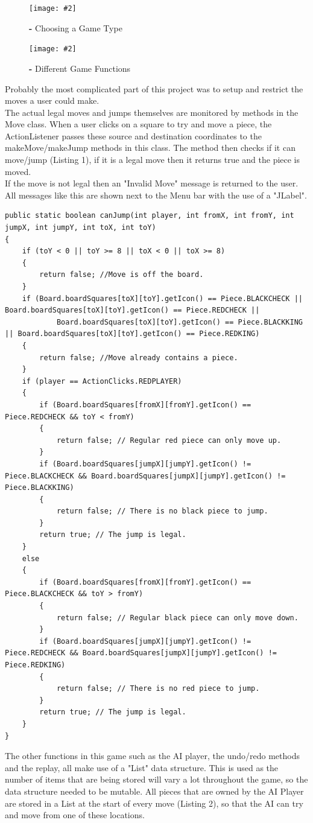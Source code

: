 \documentclass[10pt, a4paper]{article}
\newcommand{\figuremacro}[5]{
    \begin{figure}[#1]
        \centering
        \texttt{[image: \#2]}
        \caption{\textbf#4}
        \label{#3}
    \end{figure}
}
\begin{document}
\figuremacro{H}{Fig4}{}{ - Choosing a Game Type}{0.6}
\figuremacro{H}{Fig5}{}{ - Different Game Functions}{0.6}
\newpage
Probably the most complicated part of this project was to setup and restrict the moves a user could make.
\newline
\\
The actual legal moves and jumps themselves are monitored by methods in the Move class.
When a user clicks on a square to try and move a piece, the ActionListener passes these source and destination coordinates to the makeMove/makeJump methods in this class.
The method then checks if it can move/jump (Listing 1), if it is a legal move then it returns true and the piece is moved.
\newline
\\
If the move is not legal then an "Invalid Move" message is returned to the user. All messages like this are shown next to the Menu bar with the use of a "JLabel".

\begin{lstlisting}[caption = canJump Algorithm - Checking if a Jump is Legal]
public static boolean canJump(int player, int fromX, int fromY, int jumpX, int jumpY, int toX, int toY)
{
	if (toY < 0 || toY >= 8 || toX < 0 || toX >= 8) 
	{
		return false; //Move is off the board.
	}
	if (Board.boardSquares[toX][toY].getIcon() == Piece.BLACKCHECK || Board.boardSquares[toX][toY].getIcon() == Piece.REDCHECK ||
			Board.boardSquares[toX][toY].getIcon() == Piece.BLACKKING || Board.boardSquares[toX][toY].getIcon() == Piece.REDKING)
	{
		return false; //Move already contains a piece.
	}
	if (player == ActionClicks.REDPLAYER)
	{
		if (Board.boardSquares[fromX][fromY].getIcon() == Piece.REDCHECK && toY < fromY)
		{
			return false; // Regular red piece can only move up.
		}
		if (Board.boardSquares[jumpX][jumpY].getIcon() != Piece.BLACKCHECK && Board.boardSquares[jumpX][jumpY].getIcon() != Piece.BLACKKING)
		{
			return false; // There is no black piece to jump.
		}
		return true; // The jump is legal.
	}
	else
	{
		if (Board.boardSquares[fromX][fromY].getIcon() == Piece.BLACKCHECK && toY > fromY)
		{
			return false; // Regular black piece can only move down.
		}
		if (Board.boardSquares[jumpX][jumpY].getIcon() != Piece.REDCHECK && Board.boardSquares[jumpX][jumpY].getIcon() != Piece.REDKING)
		{
			return false; // There is no red piece to jump.
		}
		return true; // The jump is legal.
	}
}
\end{lstlisting}

\qquad

The other functions in this game such as the AI player, the undo/redo methods and the replay, all make use of a "List" data structure.
\newline
This is used as the number of items that are being stored will vary a lot throughout the game, so the data structure needed to be mutable.
\newline
All pieces that are owned by the AI Player are stored in a List at the start of every move (Listing 2), so that the AI can try and move from one of these locations.
\qquad
\end{document}
